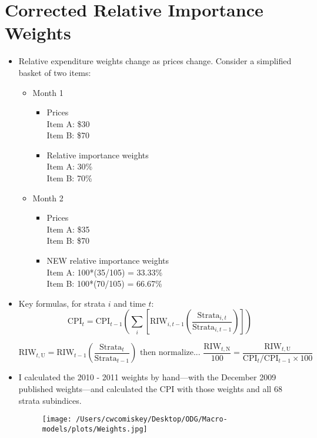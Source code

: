 \documentclass{article}
\begin{document}
\section*{Corrected Relative Importance Weights}
\begin{itemize}
\item Relative expenditure weights change as prices change. Consider a simplified basket of two items: 
\begin{itemize}
\item Month 1
    \begin{itemize}
    \item Prices \\
    Item A: \$30 \\
    Item B: \$70 \\
    \item Relative importance weights \\
    Item A: 30\% \\
    Item B: 70\%
    \end{itemize}
\item Month 2
    \begin{itemize}
    \item Prices \\
    Item A: \$35 \\
    Item B: \$70
    \item NEW relative importance weights \\
    Item A: 100*(35/105) = 33.33\% \\
    Item B: 100*(70/105) = 66.67\%
    \end{itemize}
\end{itemize}
\item Key formulas, for strata $i$ and time $t$:
$$ \text{CPI}_{t} = \text{CPI}_{t-1} \left(
  \sum_{i} \left[
    \text{RIW}_{i,t-1} \left(
      \frac{\text{Strata}_{i,t}}{\text{Strata}_{i,t-1}}
    \right)
  \right]
\right) $$

$$ \text{RIW}_{t, \text{U}} = \text{RIW}_{t-1} \left(
  \frac{\text{Strata}_{t}}{\text{Strata}_{t-1}}
  \right) \text{ then normalize... } \frac{\text{RIW}_{t, \text{N}}}{100} = \frac{\text{RIW}_{t, \text{U}}}{\text{CPI}_{t}/\text{CPI}_{t-1} \times 100}$$

\item I calculated the 2010 - 2011 weights by hand---with the December 2009 published weights---and calculated the CPI with those weights and all 68 strata subindices.
    \begin{figure}[H]
    \centering
    \texttt{[image: /Users/cwcomiskey/Desktop/ODG/Macro-models/plots/Weights.jpg]}
    \end{figure}

\end{itemize}
\end{document}
